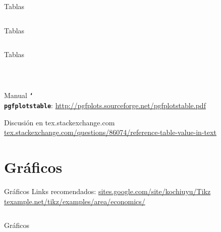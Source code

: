 \documentclass[handout,t]{beamer}
\newcommand{\bftt}[1]{\textbf{\texttt{#1}}}
\newcommand{\cmd}[1]{{\color[HTML]{008000}\bftt{#1}}} %
\newcommand{\bs}{\char`\\}
\newcommand{\cmdbs}[1]{\cmd{\bs#1}}
\begin{document}
\begin{frame}{Tablas}
        \small{
        
        }
        \inputminted[fontsize=\scriptsize]{latex}{ref_table2_tab.tex}
\end{frame}

\begin{frame}[fragile]{Tablas}
        \inputminted[fontsize=\footnotesize]{latex}{ref_table2_pre.tex}
\end{frame}

\begin{frame}[fragile]{Tablas}
        \inputminted[fontsize=\scriptsize]{latex}{ref_table1_pre.tex}
        \\
        \begin{itemize}
        \setlength{\itemindent}{-1em}
        \small{
            \item Manual \cmdbs{pgfplotstable}: \url{http://pgfplots.sourceforge.net/pgfplotstable.pdf}
            \item Discusión en tex.stackexchange.com \url{tex.stackexchange.com/questions/86074/reference-table-value-in-text}
            }
        \end{itemize}
        \end{frame}

\section{Gráficos}
\begin{frame}[fragile]{Gráficos}
Links recomendados: \url{sites.google.com/site/kochiuyu/Tikz}
\url{texample.net/tikz/examples/area/economics/}
        \inputminted[fontsize=\scriptsize]{latex}{S-D.tex}
        \resizebox{.6\textwidth}{!}{
        \hspace{10cm}
        }
\end{frame}

\begin{frame}[fragile]{Gráficos}
        \inputminted[fontsize=\scriptsize]{latex}{area.tex}
        \resizebox{.8\textwidth}{!}{
        \hspace{10cm}
        }
\end{frame}

 \begin{frame}{}
  \vspace{-.2cm}
        \inputminted[fontsize=\tiny]{latex}{intersection.tex}
        \vspace{-1.1cm}
        \begin{flushright}
      \resizebox{.3\textwidth}{!}{
        
        }
        \end{flushright}
  \end{frame}
  
\end{document}
